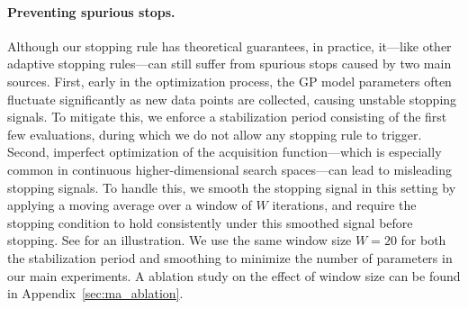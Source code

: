 \paragraph{Preventing spurious stops.}
Although our stopping rule has theoretical guarantees, in practice, it---like other adaptive stopping rules---can still suffer from spurious stops caused by two main sources.
First, early in the optimization process, the GP model parameters often fluctuate significantly as new data points are collected, causing unstable stopping signals.
To mitigate this, we enforce a stabilization period consisting of the first few evaluations, during which we do not allow any stopping rule to trigger.
Second, imperfect optimization of the acquisition function---which is especially common in continuous higher-dimensional search spaces---can lead to misleading stopping signals.
To handle this, we smooth the stopping signal in this setting by applying a moving average over a window of $W$ iterations, and require the stopping condition to hold consistently under this smoothed signal before stopping.
See  for an illustration.
We use the same window size $W=20$ for both the stabilization period and smoothing to minimize the number of parameters in our main experiments. A ablation study on the effect of window size can be found in Appendix~\ref{sec:ma_ablation}. 
